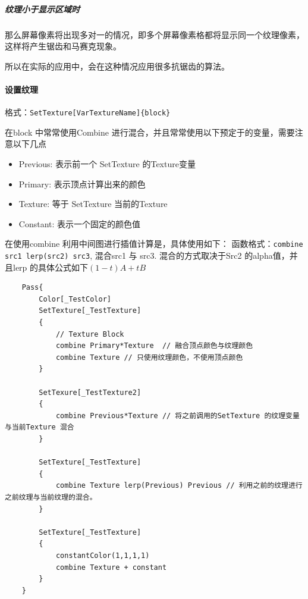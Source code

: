 \documentclass[UTF8,a4paper,12pt]{ctexbook}
\begin{document}
			\subparagraph{纹理小于显示区域时}
				那么屏幕像素将出现多对一的情况，即多个屏幕像素格都将显示同一个纹理像素，这样将产生锯齿和马赛克现象。
				
				所以在实际的应用中，会在这种情况应用很多抗锯齿的算法。
				
		\paragraph{设置纹理}
			格式：\verb|SetTexture[VarTextureName]{block}|
			
			在block 中常常使用Combine 进行混合，并且常常使用以下预定于的变量，需要注意以下几点
			\begin{itemize}
				\item Previous: 表示前一个 SetTexture 的Texture变量
				\item Primary: 表示顶点计算出来的颜色
				\item Texture: 等于 SetTexture 当前的Texture
				\item Constant: 表示一个固定的颜色值
			\end{itemize}
		
			在使用combine 利用中间图进行插值计算是，具体使用如下：
			函数格式：\verb|combine src1 lerp(src2) src3|, 混合src1 与 src3. 混合的方式取决于Src2 的alpha值，并且lerp 的具体公式如下$(1-t)A + tB$
			\begin{lstlisting}
	Pass{
		Color[_TestColor]
		SetTexture[_TestTexture]
		{
			// Texture Block
			combine Primary*Texture	 // 融合顶点颜色与纹理颜色
			combine Texture // 只使用纹理颜色，不使用顶点颜色
		}
		
		SetTexure[_TestTexture2]
		{
			combine Previous*Texture // 将之前调用的SetTexture 的纹理变量与当前Texture 混合
		}
		
		SetTexture[_TestTexture]
		{
			combine Texture lerp(Previous) Previous // 利用之前的纹理进行之前纹理与当前纹理的混合。
		}
		
		SetTexture[_TestTexture]
		{
			constantColor(1,1,1,1)
			combine Texture + constant
		}
	}
			\end{lstlisting}
		
\end{document}
